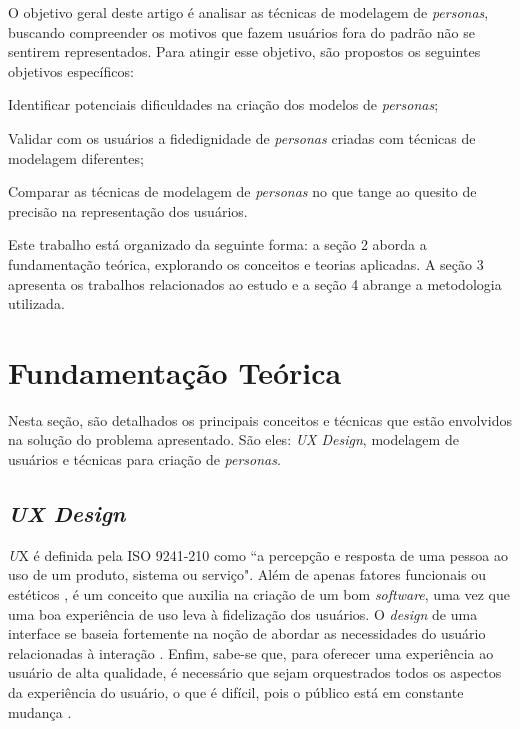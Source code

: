\documentclass[12pt]{article}
\begin{document}
\par O objetivo geral deste artigo é analisar as técnicas de modelagem de \emph{personas}, buscando compreender os motivos que fazem usuários fora do padrão não se sentirem representados. Para atingir esse objetivo, são propostos os seguintes objetivos específicos: 
\begin{enumerate*}[label=\roman*)]
    \item Identificar potenciais dificuldades na criação dos modelos de \emph{personas};
    \item Validar com os usuários a fidedignidade de \emph{personas} criadas com técnicas de modelagem diferentes;
    \item Comparar as técnicas de modelagem de \emph{personas} no que tange ao quesito de precisão na representação dos usuários.
\end{enumerate*}

\par Este trabalho está organizado da seguinte forma: a seção 2 aborda a fundamentação teórica, explorando os conceitos e teorias aplicadas. A seção 3 apresenta os trabalhos relacionados ao estudo e a seção 4 abrange a metodologia utilizada.

\section{Fundamentação Teórica} \label{sec:fundamentacao}
\par Nesta seção, são detalhados os principais conceitos e técnicas que estão envolvidos na solução do problema apresentado. São eles: \emph{UX Design}, modelagem de usuários e técnicas para criação de \emph{personas}.

\subsection{\emph{UX Design}}
\emph UX é definida pela ISO 9241-210 como ``a percepção e resposta de uma pessoa ao uso de um produto, sistema ou serviço"\cite{ISO9241210}. Além de apenas fatores funcionais ou estéticos \cite{Elements_UCD}, é um conceito que auxilia na criação de um bom \emph{software}, uma vez que uma boa experiência de uso leva à fidelização dos usuários. O \emph{design} de uma interface se baseia fortemente na noção de abordar as necessidades do usuário relacionadas à interação \cite{Hassenzahl} \cite{10.1145/2994310.2994356}. Enfim, sabe-se que, para oferecer uma experiência ao usuário de alta qualidade, é necessário que sejam orquestrados todos os aspectos da experiência do usuário, o que é difícil, pois o público está em constante mudança \cite{10.1145/1060189.1060209} \cite{10.1145/1512714.1512717}. 
\end{document}
